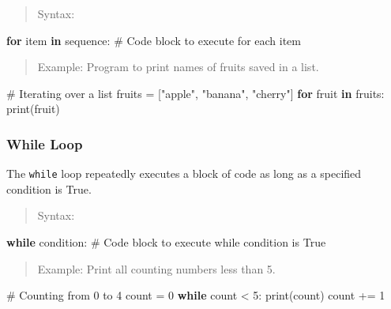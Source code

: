 \documentclass[
  letterpaper,
  DIV=11,
  numbers=noendperiod]{scrreprt}
\newenvironment{Shaded}{\begin{snugshade}}{\end{snugshade}}
\newcommand{\BuiltInTok}[1]{\textcolor[rgb]{0.00,0.23,0.31}{#1}}
\newcommand{\CommentTok}[1]{\textcolor[rgb]{0.37,0.37,0.37}{#1}}
\newcommand{\ControlFlowTok}[1]{\textcolor[rgb]{0.00,0.23,0.31}{\textbf{#1}}}
\newcommand{\DecValTok}[1]{\textcolor[rgb]{0.68,0.00,0.00}{#1}}
\newcommand{\KeywordTok}[1]{\textcolor[rgb]{0.00,0.23,0.31}{\textbf{#1}}}
\newcommand{\NormalTok}[1]{\textcolor[rgb]{0.00,0.23,0.31}{#1}}
\newcommand{\OperatorTok}[1]{\textcolor[rgb]{0.37,0.37,0.37}{#1}}
\newcommand{\StringTok}[1]{\textcolor[rgb]{0.13,0.47,0.30}{#1}}
\theoremstyle{plain}
\theoremstyle{definition}
\theoremstyle{remark}
\begin{document}
\begin{quote}
Syntax:
\end{quote}

\begin{Shaded}
\begin{Highlighting}[]
\ControlFlowTok{for}\NormalTok{ item }\KeywordTok{in}\NormalTok{ sequence:}
    \CommentTok{\# Code block to execute for each item}
\end{Highlighting}
\end{Shaded}

\begin{quote}
Example: Program to print names of fruits saved in a list.
\end{quote}

\begin{Shaded}
\begin{Highlighting}[]
\CommentTok{\# Iterating over a list}
\NormalTok{fruits }\OperatorTok{=}\NormalTok{ [}\StringTok{"apple"}\NormalTok{, }\StringTok{"banana"}\NormalTok{, }\StringTok{"cherry"}\NormalTok{]}
\ControlFlowTok{for}\NormalTok{ fruit }\KeywordTok{in}\NormalTok{ fruits:}
    \BuiltInTok{print}\NormalTok{(fruit)}
\end{Highlighting}
\end{Shaded}

\subsubsection{While Loop}\label{while-loop}

The \texttt{while} loop repeatedly executes a block of code as long as a
specified condition is True.

\begin{quote}
Syntax:
\end{quote}

\begin{Shaded}
\begin{Highlighting}[]
\ControlFlowTok{while}\NormalTok{ condition:}
    \CommentTok{\# Code block to execute while condition is True}
\end{Highlighting}
\end{Shaded}

\begin{quote}
Example: Print all counting numbers less than 5.
\end{quote}

\begin{Shaded}
\begin{Highlighting}[]
\CommentTok{\# Counting from 0 to 4}
\NormalTok{count }\OperatorTok{=} \DecValTok{0}
\ControlFlowTok{while}\NormalTok{ count }\OperatorTok{\textless{}} \DecValTok{5}\NormalTok{:}
    \BuiltInTok{print}\NormalTok{(count)}
\NormalTok{    count }\OperatorTok{+=} \DecValTok{1}
\end{Highlighting}
\end{Shaded}
\end{document}
